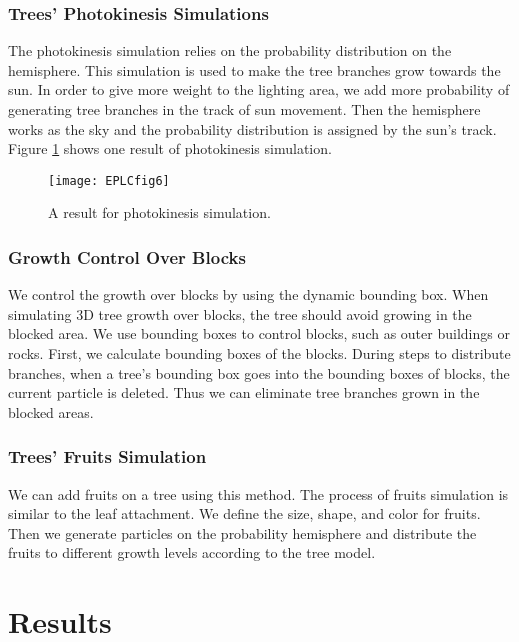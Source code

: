 \subsubsection{Trees' Photokinesis Simulations}

The photokinesis simulation relies on the probability distribution on the hemisphere. This simulation is used to make the tree branches grow towards the sun. In order to give more weight to the lighting area, we add more probability of generating tree branches in the track of sun movement. Then the hemisphere works as the sky and the probability distribution is assigned by the sun's track. Figure \ref{fig:EPLCfig6} shows one result of photokinesis simulation.
 
\begin{figure}[!t]
\centering
\texttt{[image: EPLCfig6]}
\caption{A result for photokinesis simulation.}
\label{fig:EPLCfig6}
\end{figure} 

\subsubsection{Growth Control Over Blocks}

We control the growth over blocks by using the dynamic bounding box. When simulating 3D tree growth over blocks, the tree should avoid growing in the blocked area. We use bounding boxes to control blocks, such as outer buildings or rocks. First, we calculate bounding boxes of the blocks. During steps to distribute branches, when a tree's bounding box goes into the bounding boxes of blocks, the current particle is deleted. Thus we can eliminate tree branches grown in the blocked areas.

\subsubsection{Trees' Fruits Simulation}

We can add fruits on a tree using this method. The process of fruits simulation is similar to the leaf attachment. We define the size, shape, and color for fruits. Then we generate particles on the probability hemisphere and distribute the fruits to different growth levels according to the tree model.

\section{Results} 

